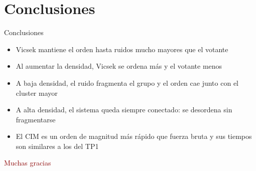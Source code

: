 \documentclass[aspectratio=169,20pt]{beamer}
\begin{document}
\section{Conclusiones}
\begin{frame}{Conclusiones}
\begin{itemize}\setlength{\itemsep}{4mm}
\item Vicsek mantiene el orden hasta ruidos mucho mayores que el votante
\item Al aumentar la densidad, Vicsek se ordena más y el votante menos
\item A baja densidad, el ruido fragmenta el grupo y el orden cae junto con el cluster mayor
\item A alta densidad, el sistema queda siempre conectado: se desordena sin fragmentarse
\item El CIM es un orden de magnitud más rápido que fuerza bruta y sus tiempos son similares a los del TP1
\end{itemize}
\end{frame}

\begin{frame}\centering{}\textcolor{darkred}{Muchas gracias}\end{frame}
\end{document}
